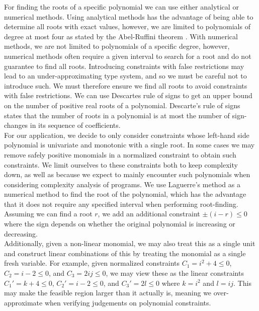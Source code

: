 For finding the roots of a specific polynomial we can use either analytical or numerical methods. Using analytical methods has the advantage of being able to determine all roots with exact values, however, we are limited to polynomials of degree at most four as stated by the Abel-Ruffini theorem \cite{abelruffinitheorem}. With numerical methods, we are not limited to polynomials of a specific degree, however, numerical methods often require a given interval to search for a root and do not guarantee to find all roots. Introducing constraints with false restrictions may lead to an under-approximating type system, and so we must be careful not to introduce such. We must therefore ensure we find all roots to avoid constraints with false restrictions. We can use Descartes rule of signs to get an upper bound on the number of positive real roots of a polynomial. Descarte's rule of signs states that the number of roots in a polynomial is at most the number of sign-changes in its sequence of coefficients.\\

For our application, we decide to only consider constraints whose left-hand side polynomial is univariate and monotonic with a single root. In some cases we may remove safely positive monomials in a normalized constraint to obtain such constraints. We limit ourselves to these constraints both to keep complexity down, as well as because we expect to mainly encounter such polynomials when considering complexity analysis of programs. We use Laguerre's method as a numerical method to find the root of the polynomial, which has the advantage that it does not require any specified interval when performing root-finding. Assuming we can find a root $r$, we add an additional constraint $\pm (i - r) \leq 0$ where the sign depends on whether the original polynomial is increasing or decreasing.\\

Additionally, given a non-linear monomial, we may also treat this as a single unit and construct linear combinations of this by treating the monomial as a single fresh variable. For example, given normalized constraints $C_1 = i^2 + 4 \leq 0$, $C_2 = i - 2 \leq 0$, and $C_3 = 2ij \leq 0$, we may view these as the linear constraints $C_1' = k + 4 \leq 0$, $C_2' = i - 2 \leq 0$, and $C_3' = 2l \leq 0$ where $k = i^2$ and $l = ij$. This may make the feasible region larger than it actually is, meaning we over-approximate when verifying judgements on polynomial constraints.

